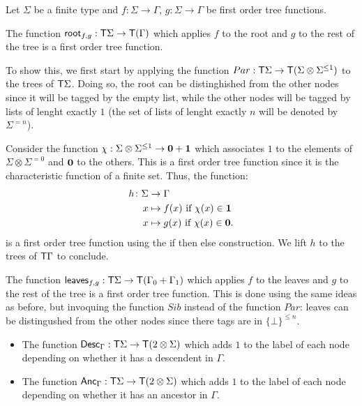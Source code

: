 \bigskip
\noindent  \begin{example} Let $\Sigma$ be a finite type and $f:\Sigma \to \Gamma$, $g: \Sigma \to \Gamma$ be first order tree functions. 

The function $\mathsf{root}_{f,g} : \mathsf T\Sigma \to \mathsf T(\Gamma)$
which applies $f$ to the root and $g$ to the rest of the tree is a first order tree function.
 
To show this, we first start by applying the function $Par:\mathsf T\Sigma\to\mathsf T(\Sigma\otimes\Sigma^{\leq 1})$ to the trees of $\mathsf T \Sigma$. Doing so, the root can be distinghished from the other nodes since it will be tagged by the empty list, while the other nodes will be tagged by lists of lenght exactly $1$ (the set of lists of lenght exactly $n$ will be denoted by $\Sigma^{=n}$).  

Consider the function $\chi:\Sigma\otimes\Sigma^{\leq 1}\to \mathbf{0}+\mathbf{1}$ which associates $1$ to the elements of $\Sigma\otimes \Sigma^{=0}$ and $\mathbf{0}$ to the others.  This is a
first order tree function since it is the characteristic function of a finite set.  Thus, the function: 
\begin{align*}
  h\colon \Sigma &\to \Gamma \\
  x &\mapsto f(x)  \text{ if } \chi(x)\in\mathbf{1}\\
  x &\mapsto g(x)  \text{ if } \chi(x)\in\mathbf{0}.
\end{align*}
is a first order tree function using the if then else construction. 
We lift $h$ to the trees of $\mathsf T\Gamma$ to conclude.



\medskip
The function $\mathsf{leaves}_{f,g} : \mathsf T\Sigma \to \mathsf T(\Gamma_0 + \Gamma_1)$
 which applies $f$ to the leaves and $g$ to the rest of the tree is a first order tree function. This is done using the same ideas as before, but invoquing the function $Sib$ instead of the function $Par$: leaves can be distingushed from the other nodes since there tags are in $\{\bot\}^{\leq n}$.
\end{example}

\bigskip
\noindent\begin{example}
\begin{itemize}
\item The function $\mathsf{Desc}_\Gamma: \mathsf T \Sigma \to \mathsf T (2\otimes\Sigma)$ which 
adds $1$ to the label of each node depending on whether it has a descendent in $\Gamma$.
\item The function $\mathsf{Anc}_\Gamma: \mathsf T \Sigma \to \mathsf T (2\otimes\Sigma)$ which 
adds $1$ to the label of each node depending on whether it has an ancestor in $\Gamma$.
\end{itemize}
\end{example}


